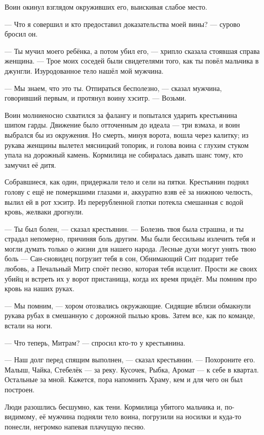 Воин окинул взглядом окруживших его, выискивая слабое место.

--- Что я совершил и кто предоставил доказательства моей вины? --- сурово бросил он.

--- Ты мучил моего ребёнка, а потом убил его, --- хрипло сказала стоявшая справа женщина.
--- Трое моих соседей были свидетелями того, как ты повёл мальчика в джунгли.
Изуродованное тело нашёл мой мужчина.

--- Мы знаем, что это ты.
Отпираться бесполезно, --- сказал мужчина, говоривший первым, и протянул воину хэситр.
--- Возьми.

Воин молниеносно схватился за фалангу и попытался ударить крестьянина шипом гарды.
Движение было отточенным до идеала --- три взмаха, и воин выбрался бы из окружения.
Но смерть, минуя ворота, вошла через калитку;
из рукава женщины вылетел мясницкий топорик, и голова воина с глухим стуком упала на дорожный камень.
Кормилица не собиралась давать шанс тому, кто замучил её дитя.

Собравшиеся, как один, придержали тело и сели на пятки.
Крестьянин поднял голову с ещё не померкшими глазами и, аккуратно взяв её за нижнюю челюсть, вылил ей в рот хэситр.
Из перерубленной глотки потекла смешанная с водой кровь, желваки дрогнули.

--- Ты был болен, --- сказал крестьянин.
--- Болезнь твоя была страшна, и ты страдал непомерно, причиняя боль другим.
Мы были бессильны излечить тебя и могли думать только о жизни для нашего народа.
Лесные духи могут унять твою боль --- Сан-сновидец погрузит тебя в сон, Обнимающий Сит подарит тебе любовь, а Печальный Митр споёт песню, которая тебя исцелит.
Прости же своих убийц и встреть их у ворот пристанища, когда их время придёт.
Мы помним про кровь на наших руках.

--- Мы помним, --- хором отозвались окружающие.
Сидящие вблизи обмакнули рукава рубах в смешанную с дорожной пылью кровь.
Затем все, как по команде, встали на ноги.

--- Что теперь, Митрам? --- спросил кто-то у крестьянина.

--- Наш долг перед спящим выполнен, --- сказал крестьянин.
--- Похороните его.
Малыш, Чайка, Стебелёк --- за реку.
Кусочек, Рыбка, Аромат --- к себе в квартал.
Остальные за мной.
Кажется, пора напомнить Храму, кем и для чего он был построен.

Люди разошлись бесшумно, как тени.
Кормилица убитого мальчика и, по-видимому, её мужчина подняли тело воина, погрузили на носилки и куда-то понесли, негромко напевая плачущую песню.


